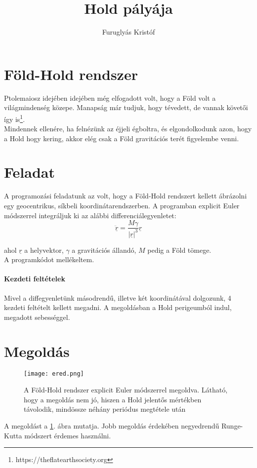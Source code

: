 \documentclass[]{article}
\title{Hold pályája}
\author{Furuglyás Kristóf}
\begin{document}
\maketitle
\newpage

\section{Föld-Hold rendszer}

Ptolemaiosz idejében idejében még elfogadott volt, hogy a Föld volt a világmindenség közepe. Manapság már tudjuk, hogy tévedett, de vannak követői így is\footnote{https://theflatearthsociety.org}. \\
Mindennek ellenére, ha felnézünk az éjjeli égboltra, és elgondolkodunk azon, hogy a Hold hogy kering, akkor elég csak a Föld gravitációs terét figyelembe venni.  

\section{Feladat}

A programozási feladatunk az volt, hogy a Föld-Hold rendszert kellett ábrázolni egy geocentrikus, síkbeli koordinátarendszerben. A programban explicit Euler módszerrel integráljuk ki az alábbi differenciálegyenletet:\\
$$
\underline{\ddot{r}}=\frac{M \gamma }{|\underline{r}|^3} \underline{r}
$$

ahol $\underline{r}$ a helyvektor, $\gamma$ a gravitációs állandó, $M$ pedig a Föld tömege.\\
A programkódot mellékeltem.

\paragraph{Kezdeti feltételek} Mivel a diffegyenletünk másodrendű, illetve két koordinátával dolgozunk, 4 kezdeti feltételt kellett megadni. A megoldásban a Hold perigeumból indul, megadott sebességgel.

\section{Megoldás}

\begin{figure}
\centering
\texttt{[image: ered.png]}
\caption{A Föld-Hold rendszer explicit Euler módszerrel megoldva. Látható, hogy a megoldás nem jó, hiszen a Hold jelentős mértékben távolodik, mindössze néhány periódus megtétele után}
\label{fig:plot}
\end{figure}
A megoldást a \ref{fig:plot}. ábra mutatja. Jobb megoldás érdekében negyedrendű Runge-Kutta módszert érdemes használni.
\end{document}
